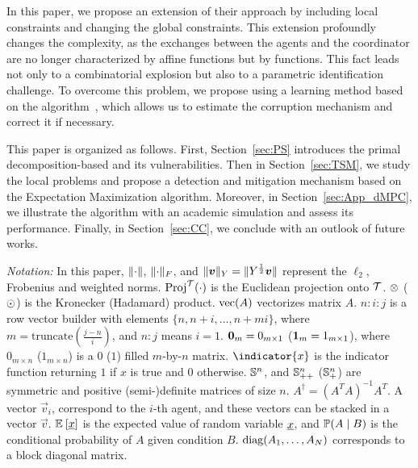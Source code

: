 \documentclass{ifacconf}  %
\begin{document}
In this paper, we propose an extension of their approach by including local constraints and changing the global constraints.
This extension profoundly changes the complexity, as the exchanges between the agents and the coordinator are no longer characterized by affine functions but by \pwa{} functions.
This fact leads not only to a combinatorial explosion but also to a parametric identification challenge.
To overcome this problem, we propose using a learning method based on the \EM{} algorithm~\citep{DempsterEtAl1977}, which allows us to estimate the corruption mechanism and correct it if necessary.

This paper is organized as follows.
First, Section~\ref{sec:PS} introduces the primal decomposition-based \dmpc{} and its vulnerabilities.
Then in Section~\ref{sec:TSM}, we study the local problems and propose a detection and mitigation mechanism based on the Expectation Maximization algorithm.
Moreover, in Section~\ref{sec:App_dMPC}, we illustrate the algorithm with an academic simulation and assess its performance.
Finally, in Section~\ref{sec:CC}, we conclude with an outlook of future works.

\emph{Notation:}
In this paper, $\lVert\cdot\rVert$, $\lVert\cdot\rVert_{F}$, and ${\lVert\boldsymbol{v}\rVert_{Y}=\lVert Y^{\frac{1}{2}}\boldsymbol{v}\rVert}$ represent the $\ell_{2}$, Frobenius and weighted norms.
$\operatorname{Proj}^{\mathcal{T}}(\cdot)$ is the Euclidean projection onto $\mathcal{T}$.
$\mathbin{\otimes}$ ($\odot$) is the Kronecker (Hadamard) product.
$\mathrm{vec} (A)$ vectorizes matrix $A$.
${n\mathbin{:}i\mathbin{:}j}$ is a row vector builder with elements $\{n,n+i,\dots,n+mi\}$, where ${m=\mathrm{truncate}(\frac{j-n}{i})}$, and ${n\mathbin{:}j}$ means ${i=1}$.
${\mathbf{0}_{m}=0_{m\times 1}}$ (${\mathbf{1}_{m}=1_{m\times 1}}$), where
$0_{m\times n}$ ($1_{m\times n}$) is a $0$ ($1$) filled \mbox{$m$-by-$n$} matrix.
$\indicator{x}$ is the indicator function returning $1$ if $x$ is true and $0$ otherwise.
$\mathbb{S}^{n}$, and $\mathbb{S}_{++}^{n}$ ($\mathbb{S}_{+}^{n}$) are symmetric and positive (semi-)definite matrices of size $n$.
${A^{\dagger}={{(A^{T}A)}^{-1}A^{T}}}$.
A vector $\vec{v}_{i}$, correspond to the $i$-th agent, and these vectors can be stacked in a vector $\vec{v}$.
$\mathbb{E}_{}\left[\underline{x}\right]$ is the expected value of random variable $\underline{x}$, and $\mathbb{P}(A \mid B)$ is the conditional probability of $A$ given condition $B$.
${\operatorname{diag}(A_{1},\dots,A_{N})}$ corresponds to a block diagonal matrix.
\end{document}

